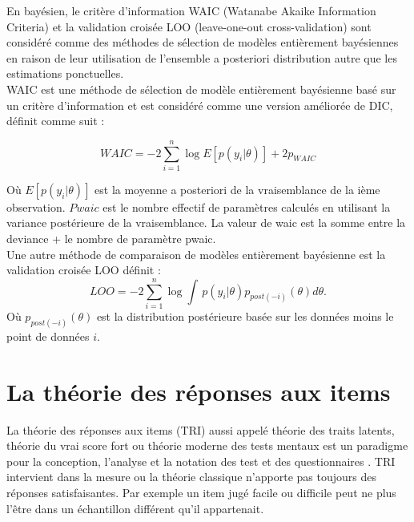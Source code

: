 \noindent En bayésien, le critère d'information WAIC (Watanabe Akaike Information Criteria) et la validation croisée LOO (leave-one-out cross-validation) sont considéré comme des méthodes de sélection de modèles entièrement bayésiennes en raison de leur utilisation de l'ensemble a posteriori distribution autre que les estimations ponctuelles. \\

\noindent WAIC \cite{watanabe2010asymptotic} est une méthode de sélection de modèle entièrement bayésienne basé sur un critère d'information et est considéré comme une version améliorée de DIC, définit comme suit :

\begin{equation}
	WAIC = -2\sum_{i=1}^{n} \log E\left[ p(y_{i}|\theta) \right] + 2p_{WAIC}
	\label{waic_formula}
\end{equation}

Où \(\displaystyle E\left[ p(y_{i}|\theta) \right] \) est la moyenne a posteriori de la vraisemblance de la ième observation.
\(\displaystyle Pwaic \)  est le nombre effectif de paramètres calculés en utilisant la variance postérieure de la vraisemblance.
La valeur de waic est la somme entre la deviance + le nombre de paramètre pwaic. \\

\noindent Une autre méthode de comparaison de modèles entièrement bayésienne est la validation croisée LOO \cite{geisser1979predictive} définit : \\

\begin{equation}
	LOO = -2\sum_{i=1}^{n} \log \int \,p(y_{i}|\theta)p_{post(-i)}(\theta)d\theta.
	\label{loo_formula}
\end{equation}
 Où \(\displaystyle p_{post(-i)}(\theta) \) est la distribution postérieure basée sur les données moins le point de données \(\displaystyle i \).
\section{La théorie des réponses aux items}
La théorie des réponses aux items (TRI) aussi appelé théorie des traits latents, théorie du vrai score fort ou théorie moderne des tests mentaux est un paradigme pour la conception, l’analyse et la notation des test et des questionnaires \cite{fisher1922mathematical}. TRI intervient dans la mesure ou la théorie classique n’apporte pas toujours des réponses satisfaisantes. Par exemple un item jugé facile ou difficile peut ne plus l’être dans un échantillon différent qu’il appartenait.


